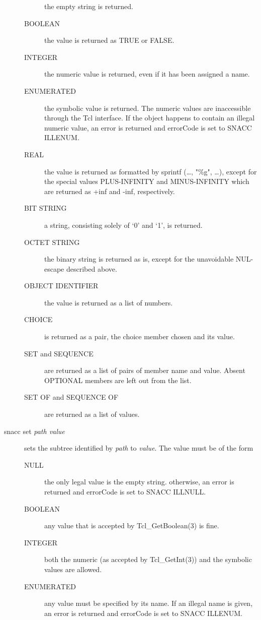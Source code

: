 \begin{description}
\begin{description}
	the empty string is returned.
      \item[BOOLEAN]
	the value is returned as {\Tcl TRUE} or {\Tcl FALSE}.
      \item[INTEGER]
	the numeric value is returned, even if it has been assigned a name.
      \item[ENUMERATED]
	the symbolic value is returned.
	The numeric values are inaccessible through the Tcl interface.
	If the object happens to contain an illegal numeric value, an error is returned and {\Tcl errorCode} is set to {\Tcl SNACC ILLENUM}.
      \item[REAL]
	the value is returned as formatted by {\C sprintf (\dots, "\%g", \dots)}, except for the special values {\ASN PLUS-INFINITY} and {\ASN MINUS-INFINITY} which are returned as {\Tcl +inf} and {\Tcl -inf}, respectively.
      \item[BIT STRING]
	a string, consisting solely of `0' and `1', is returned.
      \item[OCTET STRING]
	the binary string is returned as is, except for the unavoidable NUL-escape described above.
      \item[OBJECT IDENTIFIER]
	the value is returned as a list of numbers.
      \item[CHOICE]
	is returned as a pair, the choice member chosen and its value.
      \item[SET \textnormal{and} SEQUENCE]
	are returned as a list of pairs of member name and value.
	Absent OPTIONAL members are left out from the list.
      \item[SET OF \textnormal{and} SEQUENCE OF]
	are returned as a list of values.
    \end{description}%
  \item[{\Tcl snacc set \emph{path value}}] sets the subtree identified by \emph{path} to \emph{value}.
    The value must be of the form 
    \begin{description}%
      \item[NULL]
	the only legal value is the empty string.
	otherwise, an error is returned and {\Tcl errorCode} is set to {\Tcl SNACC ILLNULL}.
      \item[BOOLEAN]
	any value that is accepted by {\C Tcl\_GetBoolean}(3) is fine.
      \item[INTEGER]
	both the numeric (as accepted by {\C Tcl\_GetInt(3)}) and the symbolic values are allowed.
      \item[ENUMERATED]
	any value must be specified by its name.
	If an illegal name is given, an error is returned and {\Tcl errorCode} is set to {\Tcl SNACC ILLENUM}.

\end{description}
\end{description}

